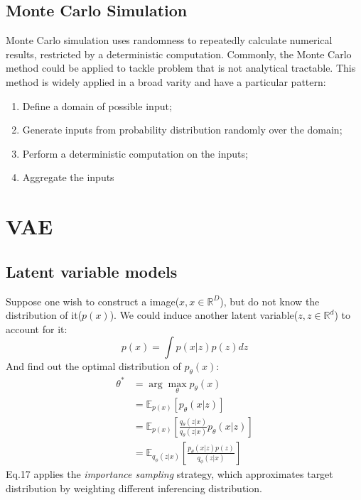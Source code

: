 \documentclass{article}
\newcommand{\argmax}{\arg\!\max}
\begin{document}
\subsection{Monte Carlo Simulation}
Monte Carlo simulation uses randomness to repeatedly calculate numerical results, restricted by a deterministic computation. Commonly, the Monte Carlo method could be applied to tackle problem that is not analytical tractable. This method is widely applied in a broad varity and have a particular pattern: \\
\begin{enumerate}
\item Define a domain of possible input;
\item Generate inputs from probability distribution randomly over the domain;
\item Perform a deterministic computation on the inputs;
\item Aggregate the inputs
\end{enumerate}
\section{VAE}
\subsection{Latent variable models}
Suppose one wish to construct a image($x, x\in \mathbb{R}^{D}$), but do not know the distribution of it($p(x)$). We could induce another latent variable($z, z\in \mathbb{R}^d$) to account for it:
\begin{equation}
p(x) = \int p(x|z)p(z)dz     
\end{equation}
And find out the optimal distribution of $p_{\theta}(x)$:
    \begin{align}
    \theta^{*} &= \argmax_{\theta} p_{\theta}(x)\\
    & =\mathbb{E}_{p(x)} [p_{\theta}(x|z)]\\ 
    & =\mathbb{E}_{p(x)} [\frac{q_{\theta}(z|x)}{q_{\theta}(z|x)}p_{\theta}(x|z)]\\
    & =\mathbb{E}_{q_{\phi}(z|x)}[\frac{p_{\theta}(x|z)p(z)}{q_{\phi}(z|x)}]
    \end{align}
Eq.17 applies the \textit{importance sampling} strategy, which approximates target distribution by weighting different inferencing distribution. 
\end{document}
